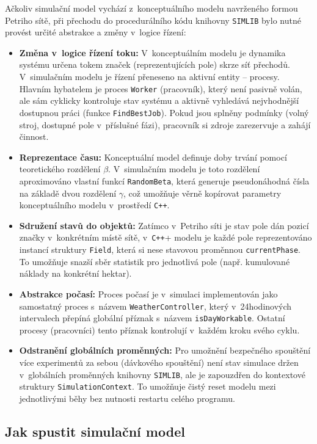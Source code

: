 \documentclass[11pt,a4paper]{article}
\begin{document}
Ačkoliv simulační model vychází z~konceptuálního modelu navrženého formou Petriho sítě, při přechodu do procedurálního kódu knihovny \texttt{SIMLIB} bylo nutné provést určité abstrakce a změny v~logice řízení:

\begin{itemize}
    \item \textbf{Změna v~logice řízení toku:} V~konceptuálním modelu je dynamika systému určena tokem značek (reprezentujících pole) skrze síť přechodů. V~simulačním modelu je řízení přeneseno na aktivní entity -- procesy. Hlavním hybatelem je proces \texttt{Worker} (pracovník), který není pasivně volán, ale sám cyklicky kontroluje stav systému a aktivně vyhledává nejvhodnější dostupnou práci (funkce \texttt{FindBestJob}). Pokud jsou splněny podmínky (volný stroj, dostupné pole v~příslušné fázi), pracovník si zdroje zarezervuje a zahájí činnost.
    \item \textbf{Reprezentace času:} Konceptuální model definuje doby trvání pomocí teoretického rozdělení $\beta$. V~simulačním modelu je toto rozdělení aproximováno vlastní funkcí \texttt{RandomBeta}, která generuje pseudonáhodná čísla na základě dvou rozdělení $\gamma$, což umožňuje věrně kopírovat parametry konceptuálního modelu v~prostředí \texttt{C++}.
    \item \textbf{Sdružení stavů do objektů:} Zatímco v~Petriho síti je stav pole dán pozicí značky v~konkrétním místě sítě, v~\texttt{C++}+ modelu je každé pole reprezentováno instancí struktury \texttt{Field}, která si nese stavovou proměnnou \texttt{currentPhase}. To umožňuje snazší sběr statistik pro jednotlivá pole (např. kumulované náklady na konkrétní hektar).
    \item \textbf{Abstrakce počasí:} Proces počasí je v~simulaci implementován jako samostatný proces s~názvem \texttt{WeatherController}, který v~24hodinových intervalech přepíná globální příznak s~názvem \texttt{isDayWorkable}. Ostatní procesy (pracovníci) tento příznak kontrolují v~každém kroku svého cyklu.
    \item \textbf{Odstranění globálních proměnných:} Pro umožnění bezpečného spouštění více experimentů za sebou (dávkového spouštění) není stav simulace držen v~globálních proměnných knihovny \texttt{SIMLIB}, ale je zapouzdřen do kontextové struktury \texttt{SimulationContext}. To umožňuje čistý reset modelu mezi jednotlivými běhy bez nutnosti restartu celého programu.
\end{itemize}

\subsection{Jak spustit simulační model}\label{jak-spustit-simulacni-model}
\end{document}
